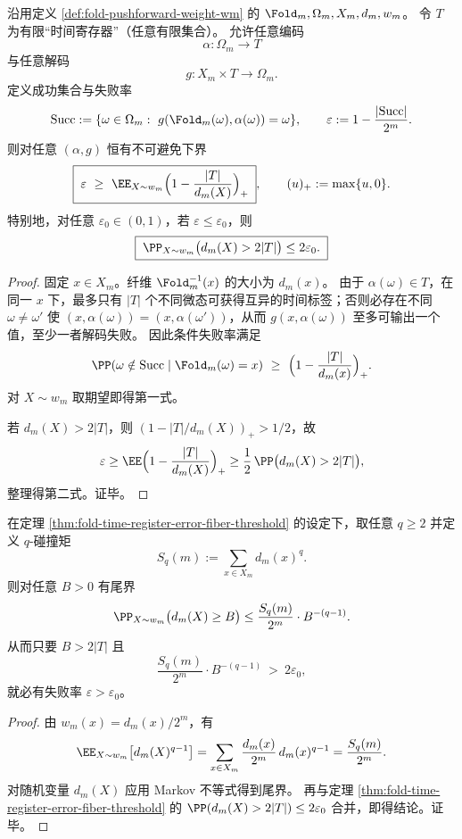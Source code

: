 \begin{theorem}\label{thm:fold-time-register-error-fiber-threshold}
沿用定义 \ref{def:fold-pushforward-weight-wm} 的 \(\Fold_m,\Omega_m,X_m,d_m,w_m\)。
令 \(T\) 为有限“时间寄存器”（任意有限集合）。
允许任意编码
\[
\alpha:\Omega_m\to T
\]
与任意解码
\[
g:X_m\times T\to \Omega_m.
\]
定义成功集合与失败率
\[
\mathrm{Succ}:=\{\omega\in\Omega_m:\ g(\Fold_m(\omega),\alpha(\omega))=\omega\},
\qquad
\varepsilon:=1-\frac{|\mathrm{Succ}|}{2^m}.
\]
则对任意 \((\alpha,g)\) 恒有不可避免下界
\[
\boxed{\;
\varepsilon\ \ge\ \EE_{X\sim w_m}\Bigl(1-\frac{|T|}{d_m(X)}\Bigr)_+ \;},
\qquad (u)_+:=\max\{u,0\}.
\]
特别地，对任意 \(\varepsilon_0\in(0,1)\)，若 \(\varepsilon\le \varepsilon_0\)，则
\[
\boxed{\;
\PP_{X\sim w_m}\bigl(d_m(X)>2|T|\bigr)\le 2\varepsilon_0.\;}
\]
\end{theorem}

\begin{proof}
固定 \(x\in X_m\)。纤维 \(\Fold_m^{-1}(x)\) 的大小为 \(d_m(x)\)。
由于 \(\alpha(\omega)\in T\)，在同一 \(x\) 下，最多只有 \(|T|\) 个不同微态可获得互异的时间标签；否则必存在不同 \(\omega\neq \omega'\) 使 \((x,\alpha(\omega))=(x,\alpha(\omega'))\)，从而 \(g(x,\alpha(\omega))\) 至多可输出一个值，至少一者解码失败。
因此条件失败率满足
\[
\PP(\omega\notin\mathrm{Succ}\mid \Fold_m(\omega)=x)\ \ge\ \Bigl(1-\frac{|T|}{d_m(x)}\Bigr)_+.
\]
对 \(X\sim w_m\) 取期望即得第一式。
\par
若 \(d_m(X)>2|T|\)，则 \((1-|T|/d_m(X))_+>1/2\)，故
\[
\varepsilon
\ge \EE\Bigl(1-\frac{|T|}{d_m(X)}\Bigr)_+
\ge \frac12\,\PP\bigl(d_m(X)>2|T|\bigr),
\]
整理得第二式。证毕。
\end{proof}

\begin{corollary}[碰撞矩尾界诱导的规模律]\label{cor:fold-time-register-moment-tail-scaling}
在定理 \ref{thm:fold-time-register-error-fiber-threshold} 的设定下，取任意 \(q\ge 2\) 并定义 \(q\)-碰撞矩
\[
S_q(m):=\sum_{x\in X_m}d_m(x)^q.
\]
则对任意 \(B>0\) 有尾界
\[
\PP_{X\sim w_m}\bigl(d_m(X)\ge B\bigr)
\le \frac{S_q(m)}{2^m}\cdot B^{-(q-1)}.
\]
从而只要 \(B>2|T|\) 且
\[
\frac{S_q(m)}{2^m}\cdot B^{-(q-1)}\ >\ 2\varepsilon_0,
\]
就必有失败率 \(\varepsilon>\varepsilon_0\)。
\end{corollary}

\begin{proof}
由 \(w_m(x)=d_m(x)/2^m\)，有
\[
\EE_{X\sim w_m}\bigl[d_m(X)^{q-1}\bigr]
=\sum_{x\in X_m}\frac{d_m(x)}{2^m}\,d_m(x)^{q-1}
=\frac{S_q(m)}{2^m}.
\]
对随机变量 \(d_m(X)\) 应用 Markov 不等式得到尾界。
再与定理 \ref{thm:fold-time-register-error-fiber-threshold} 的
\(\PP(d_m(X)>2|T|)\le 2\varepsilon_0\)
合并，即得结论。证毕。
\end{proof}

\endinput
